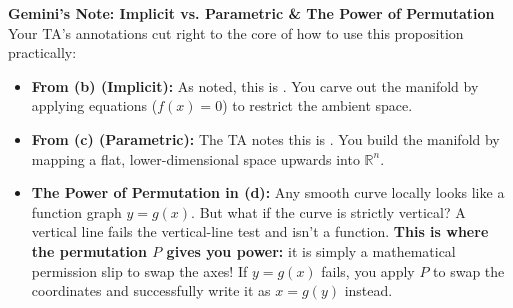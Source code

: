 \setcounter{section}{\value{savedSec}}
\setcounter{theorem}{\value{savedThm}}

\begin{extra}
\textbf{Gemini's Note: Implicit vs. Parametric \& The Power of Permutation}\\
Your TA's annotations cut right to the core of how to use this proposition practically:
\begin{itemize}
    \item \textbf{From \textbf{(b)} (Implicit):} As noted, this is . You carve out the manifold by applying equations ($f(x)=0$) to restrict the ambient space.
    \item \textbf{From \textbf{(c)} (Parametric):} The TA notes this is . You build the manifold by mapping a flat, lower-dimensional space upwards into $\mathbb{R}^n$.
    \item \textbf{The Power of Permutation in \textbf{(d)}:} Any smooth curve locally looks like a function graph $y=g(x)$. But what if the curve is strictly vertical? A vertical line fails the vertical-line test and isn't a function. \textbf{This is where the permutation $P$ gives you power:} it is simply a mathematical permission slip to swap the axes! If $y=g(x)$ fails, you apply $P$ to swap the coordinates and successfully write it as $x=g(y)$ instead. 
\end{itemize}
\end{extra}

